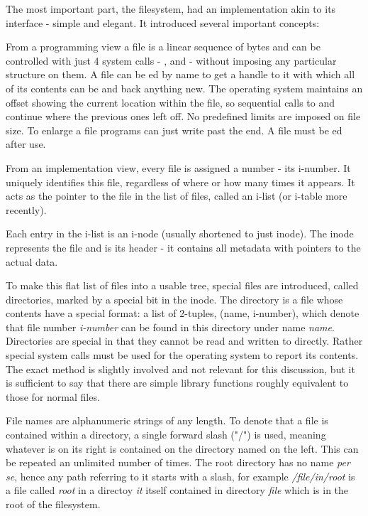         The most important part, the filesystem, had an implementation akin to
        its interface - simple and elegant. It introduced several important
        concepts:

        From a programming view a file is a linear sequence of bytes and can be
        controlled with just 4 system calls -  ,
         and  - without imposing any particular
        structure on them. A file can be ed by name to get a
        handle to it with which all of its contents can be  and
         back anything new. The operating system maintains an
        offset showing the current location within the file, so sequential
        calls to  and  continue where the previous
        ones left off. No predefined limits are imposed on file size. To
        enlarge a file programs can just write past the end. A file must be
        ed after use.

        From an implementation view, every file is assigned a number - its
        i-number. It uniquely identifies this file, regardless of where or how
        many times it appears. It acts as the pointer to the file in the list
        of files, called an i-list (or i-table more recently).

        Each entry in the i-list is an i-node (usually shortened to just
        inode). The inode represents the file and is its header - it contains
        all metadata with pointers to the actual data.

        To make this flat list of files into a usable tree, special files are
        introduced, called directories, marked by a special bit in the inode.
        The directory is a file whose contents have a special format: a list of
        2-tuples, (name, i-number), which denote that file number
        \textit{i-number} can be found in this directory under name
        \textit{name}. Directories are special in that they cannot be read and
        written to directly. Rather special system calls must be used for the
        operating system to report its contents. The exact method is slightly
        involved and not relevant for this discussion, but it is sufficient to
        say that there are simple library functions roughly equivalent to those
        for normal files.

        File names are alphanumeric strings of any length. To denote that a
        file is contained within a directory, a single forward slash ("/") is
        used, meaning whatever is on its right is contained on the directory
        named on the left. This can be repeated an unlimited number of times.
        The root directory has no name \textit{per se}, hence any path referring
        to it starts with a slash, for example \textit{/file/in/root} is a file
        called \textit{root} in a directoy \textit{it} itself contained in
        directory \textit{file} which is in the root of the filesystem.

